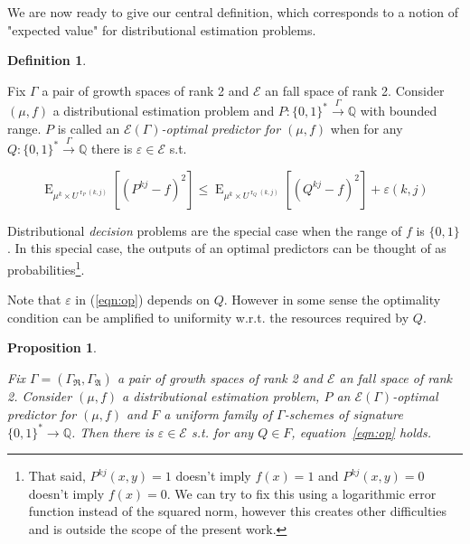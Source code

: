 \documentclass{article}
\theoremstyle{definition}
\newtheorem{definition}{Definition}[section]
\theoremstyle{plain}
\newtheorem{proposition}{Proposition}[section]
\newcommand{\Words}{{\{ 0, 1 \}^*}}
\newcommand{\Bool}{\{0,1\}}
\DeclareMathOperator{\E}{E}
\DeclareMathOperator{\R}{r}
\newcommand{\Rats}{\mathbb{Q}}
\begin{document}
We are now ready to give our central definition, which corresponds to a notion of "expected value" for distributional estimation problems.

\begin{definition}
\label{def:op}

Fix $\Gamma$ a pair of growth spaces of rank 2 and $\mathcal{E}$ an fall space of rank 2. Consider $(\mu,f)$ a distributional estimation problem and $P: \Words \xrightarrow{\Gamma} \Rats$ with bounded range. $P$ is called an \emph{$\mathcal{E}(\Gamma)$-optimal predictor for $(\mu,f)$} when for any $Q: \Words \xrightarrow{\Gamma} \Rats$ there is $\varepsilon \in \mathcal{E}$ s.t.

\begin{equation}
\label{eqn:op}
\E_{\mu^k \times U^{\R_P(k,j)}}[(P^{kj} - f)^2] \leq \E_{\mu^k \times U^{\R_Q(k,j)}}[(Q^{kj} - f)^2] + \varepsilon(k,j)
\end{equation}

\end{definition}

Distributional \emph{decision} problems are the special case when the range of $f$ is $\Bool$. In this special case, the outputs of an optimal predictors can be thought of as probabilities\footnote{That said, $P^{kj}(x,y)=1$ doesn't imply $f(x) = 1$ and $P^{kj}(x,y)=0$ doesn't imply $f(x)=0$. We can try to fix this using a logarithmic error function instead of the squared norm, however this creates other difficulties and is outside the scope of the present work.}.

Note that $\varepsilon$ in (\ref{eqn:op}) depends on $Q$. However in some sense the optimality condition can be amplified to uniformity w.r.t. the resources required by $Q$.

\begin{proposition}
\label{prp:unif}

Fix $\Gamma=(\Gamma_{\mathfrak{R}},\Gamma_{\mathfrak{A}})$ a pair of growth spaces of rank 2 and $\mathcal{E}$ an fall space of rank 2. Consider $(\mu,f)$ a distributional estimation problem, $P$ an $\mathcal{E}(\Gamma)$-optimal predictor for $(\mu,f)$ and $F$ a uniform family of $\Gamma$-schemes of signature $\Words \rightarrow \Rats$. Then there is $\varepsilon \in \mathcal{E}$ s.t. for any $Q \in F$, equation~\ref{eqn:op} holds.

\end{proposition}
\end{document}
